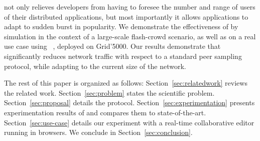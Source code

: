 \SPRAY not only relieves developers from having to foresee the number
and range of users of their distributed applications, but most
importantly it allows applications to adapt to sudden burst in
popularity. We demonstrate the effectiveness of \SPRAY by simulation
in the context of a large-scale flash-crowd scenario, as well as on a
real use case using \CRATE~\cite{nedelec2016crate}, deployed on
Grid'5000. Our results demonstrate that \SPRAY significantly reduces
network traffic with respect to a standard peer sampling protocol,
while adapting to the current size of the network. 


The rest of this paper is organized as follows: Section~\ref{sec:relatedwork}
reviews the related work. Section~\ref{sec:problem} states the scientific
problem. Section~\ref{sec:proposal} details the \SPRAY
protocol. Section~\ref{sec:experimentation} presents experimentation results of
\SPRAY and compares them to state-of-the-art. Section~\ref{sec:use-case} details
our experiment with \CRATE a real-time collaborative editor running in
browsers. We conclude in Section~\ref{sec:conclusion}.

